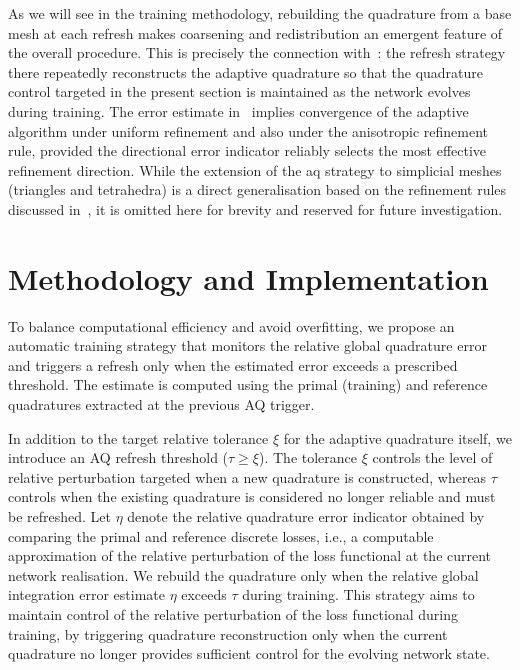 \documentclass[oneside,reqno,11pt,a4paper]{amsart}
\theoremstyle{definition}
\begin{document}
As we will see in the training methodology, rebuilding the quadrature from a
base mesh at each refresh makes coarsening and redistribution an emergent
feature of the overall procedure.
This is precisely the connection with~:
the refresh strategy there repeatedly reconstructs the adaptive quadrature so
that the quadrature control targeted in the present section is maintained as
the network evolves during training.
The error estimate in~ implies convergence of the adaptive
algorithm under uniform refinement and also under the anisotropic refinement
rule, provided the directional error indicator reliably selects the most
effective refinement direction.
While the extension of the \ac{aq} strategy to simplicial meshes (triangles and
tetrahedra) is a direct generalisation based on the refinement rules discussed
in~, it is omitted here for brevity
and reserved for future investigation.

\section{Methodology and Implementation} \label{sec:methodology}

To balance computational efficiency and avoid overfitting, we propose an
automatic training strategy that monitors the relative global quadrature error
and triggers a refresh only when the estimated error exceeds a prescribed
threshold. The estimate is computed using the primal (training) and reference
quadratures extracted at the previous AQ trigger.

In addition to the target relative tolerance $\xi$ for the adaptive quadrature itself, we introduce an AQ refresh threshold ($\tau \ge \xi$). The tolerance $\xi$ controls the level of relative perturbation targeted when a new quadrature is constructed, whereas $\tau$ controls when the existing quadrature is considered no longer reliable and must be refreshed. Let $\eta$ denote the relative quadrature error indicator obtained by comparing the primal and reference discrete losses, i.e., a computable approximation of the relative perturbation of the loss functional at the current network realisation. We rebuild the quadrature only when the relative global integration error estimate $\eta$ exceeds $\tau$ during training.
This strategy aims to maintain control of the relative perturbation of the loss functional during training, by triggering quadrature reconstruction only when the current quadrature no longer provides sufficient control for the evolving network state.
\end{document}
